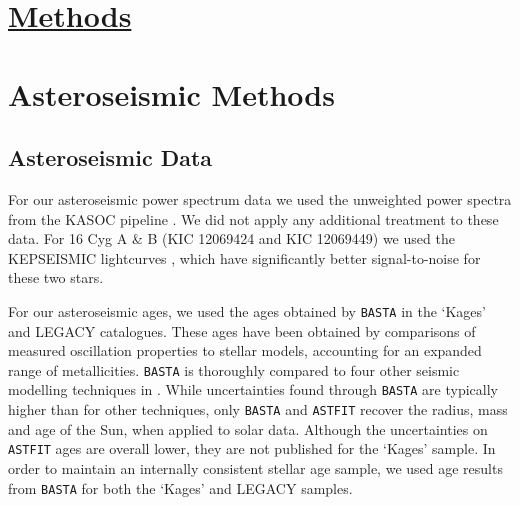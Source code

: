 %
%
%
%
%

\section*{\underline{Methods}}
\setcounter{tocdepth}{2}
\tableofcontents
\section{Asteroseismic Methods}
\subsection{Asteroseismic Data}
For our asteroseismic power spectrum data we used the unweighted power spectra from the KASOC pipeline \cite{m_handberg+lund2014}. We did not apply any additional treatment to these data. For 16 Cyg A \& B (KIC 12069424 and KIC 12069449) we used the KEPSEISMIC lightcurves \cite{m_garcia+2011}, which have significantly better signal-to-noise for these two stars.

For our asteroseismic ages, we used the ages obtained by \texttt{BASTA} \cite[BAyesian STellar Algorithm]{m_silvaaguirre+2015} in the `Kages' and LEGACY catalogues. These ages have been obtained by comparisons of measured oscillation properties to stellar models, accounting for an expanded range of metallicities. \texttt{BASTA} is thoroughly compared to four other seismic modelling techniques in \cite{m_silvaaguirre+2017}. While uncertainties found through \texttt{BASTA} are typically higher than for other techniques, only \texttt{BASTA} and \texttt{ASTFIT} \cite[Aarhus STellar Evolution Code]{m_christensen-dalsgaard2008} recover the radius, mass and age of the Sun, when applied to solar data. Although the uncertainties on \texttt{ASTFIT} ages are overall lower, they are not published for the `Kages' sample. In order to maintain an internally consistent stellar age sample, we used age results from \texttt{BASTA} for both the `Kages' and LEGACY samples.


